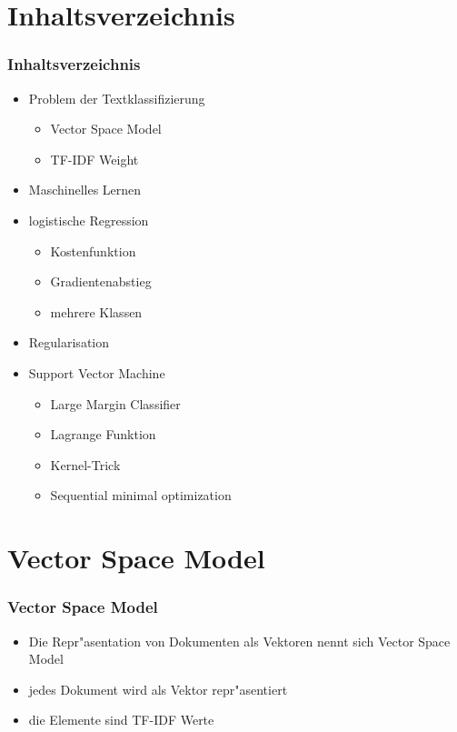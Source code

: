 \documentclass{beamer}
\begin{document}
\section{Inhaltsverzeichnis}
\label{sec:toc}

\begin{frame}
  \frametitle{Inhaltsverzeichnis}
  \begin{itemize}
  \item Problem der Textklassifizierung
    \begin{itemize}
    \item Vector Space Model
    \item TF-IDF Weight
    \end{itemize}
  \item Maschinelles Lernen
  \item logistische Regression
    \begin{itemize}
    \item Kostenfunktion
    \item Gradientenabstieg
    \item mehrere Klassen
    \end{itemize}
  \item Regularisation
  \item Support Vector Machine
    \begin{itemize}
    \item Large Margin Classifier
    \item Lagrange Funktion
    \item Kernel-Trick
    \item Sequential minimal optimization
    \end{itemize}
  \end{itemize}
\end{frame}

\section{Vector Space Model}

\begin{frame}
  \frametitle{Vector Space Model}
  \begin{itemize}
  \item Die Repr"asentation von Dokumenten als Vektoren nennt sich Vector Space Model
  \item jedes Dokument wird als Vektor repr"asentiert
  \item die Elemente sind TF-IDF Werte
  \end{itemize}

\end{frame}
\end{document}
